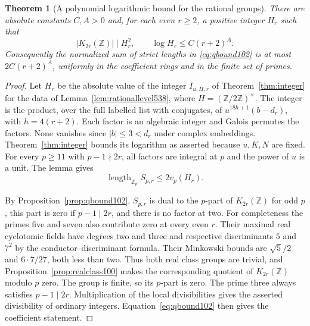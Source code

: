 \documentclass[a4paper,11pt]{article}
\newtheorem{theorem}[proposition]{Theorem}
\theoremstyle{definition}
\theoremstyle{remark}
\newcommand{\ZZ}{\mathbb Z}\newcommand{\ord}{\operatorname{ord}}
\numberwithin{equation}{section}
\begin{document}
\begin{theorem}[A polynomial logarithmic bound for the rational groups]
\leavevmode\label{thm:rationalpolynomial538}
There are absolute constants \(C,A>0\) and, for each even
\(r\ge2\), a positive integer \(H_r\) such that
\[
       |K_{2r}(\ZZ)|\mid H_r^2,\qquad
       \log H_r\le C(r+2)^A .
\]
Consequently the normalized sum of strict lengths in
\eqref{eq:qbound102} is at most \(2C(r+2)^A\), uniformly
in the coefficient rings and in the finite set of primes.
\end{theorem}
\begin{proof}
Let \(H_r\) be the absolute value of the integer \(I_{u,H,r}\)
of Theorem~\ref{thm:integer} for the data of
Lemma~\ref{lem:rationallevel538}, where \(H=(\ZZ/2\ZZ)^\times\).
The integer is the product, over the full labelled list with
conjugates, of \(u^{18h+1}(b-d_r)\), with \(h=4(r+2)\).
Each factor is an algebraic integer and Galois permutes the
factors. None vanishes since \(|b|\le3<d_r\) under complex
embeddings. Theorem~\ref{thm:integer} bounds its logarithm
as asserted because \(u,K,N\) are fixed. For every \(p\ge11\)
with \(p-1\nmid2r\), all factors are integral at \(p\) and the
power of \(u\) is a unit. The lemma gives
\[
       \operatorname{length}_{\ZZ_p}S_{p,r}\le2v_p(H_r).
\]

By Proposition~\ref{prop:qbound102}, \(S_{p,r}\) is dual
to the \(p\)-part of \(K_{2r}(\ZZ)\) for odd \(p\), this part
is zero if \(p-1\mid2r\), and there is no factor at two.
For completeness the primes five and seven also contribute
zero at every even \(r\). Their maximal real cyclotomic fields
have degrees two and three and respective discriminants
\(5\) and \(7^2\) by the conductor--discriminant formula.
Their Minkowski bounds are \(\sqrt5/2\) and \(6\cdot7/27\),
both less than two. Thus both real class groups are trivial,
and Proposition~\ref{prop:realclass100} makes the corresponding
quotient of \(K_{2r}(\ZZ)\) modulo \(p\) zero. The group is finite,
so its \(p\)-part is zero. The prime three always satisfies
\(p-1\mid2r\). Multiplication of the local divisibilities gives
the asserted divisibility of ordinary integers.
Equation~\eqref{eq:qbound102} then gives the coefficient statement.
\end{proof}
\end{document}
